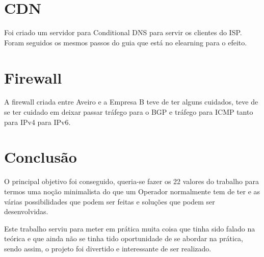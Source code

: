 \documentclass[pdftex,12pt,a4paper]{report}
\begin{document}
\section{CDN}

Foi criado um servidor para Conditional DNS para servir os clientes do ISP. Foram seguidos os mesmos passos do guia que está no elearning para o efeito.

\section{Firewall}

A firewall criada entre Aveiro e a Empresa B teve de ter alguns cuidados, teve de se ter cuidado em deixar passar tráfego para o BGP e tráfego para ICMP tanto para IPv4 para IPv6.

\newpage

\section{Conclusão}

O principal objetivo foi conseguido, queria-se fazer os 22 valores do trabalho para termos uma noção minimalista do que um Operador normalmente tem de ter e as várias possibilidades que podem ser feitas e soluções que podem ser desenvolvidas. 

Este trabalho serviu para meter em prática muita coisa que tinha sido falado na teórica e que ainda não se tinha tido oportunidade de se abordar na prática, sendo assim, o projeto foi divertido e interessante de ser realizado.
\end{document}
